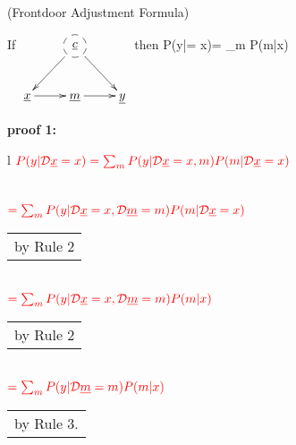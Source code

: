 \begin{claim} (Frontdoor
Adjustment Formula)
\label{cl-frontdoor-proof}

If
$
\xymatrix{
&*++[F-o]{\rvc}\ar[ld]\ar[rd]
\\
\rvx\ar[r]&\rvm\ar[r]&\rvy
}$
then
\beq
P(y|\cald \rvx = x)=
\sum_m
P(m|x)
\eeq

\beq
{}
\eeq
\end{claim}

\proof


{\bf * proof 1:}
\\
\begin{longtable}{l}
$\color{red}
P(y|{\cal D}{\underline{x}}=x)=
\sum_{m}
P(y|{\cal D}{\underline{x}}=x, m)
P(m|{\cal D}{\underline{x}}=x)$
\\
\\
\xymatrix{\\=}
\\
$\color{red}=
\sum_{m}
P(y|{\cal D}{\underline{x}}=x, {\cal D}{\underline{m}}=m)
P(m|{\cal D}{\underline{x}}=x)$
\\
\begin{tabular}{l}
\\
by Rule 2
\end{tabular}
\\
$\color{red}=
\sum_{m}
P(y|{\cal D}{\underline{x}}=x, {\cal D}{\underline{m}}=m)
P(m| x)$
\\
\begin{tabular}{l}
\\
by Rule 2
\end{tabular}
\\
$\color{red}=
\sum_{m}
P(y|{\cal D}{\underline{m}}=m)
P(m|x)$
\\
\begin{tabular}{l}
by Rule 3.\\

\end{tabular}
\end{longtable}
